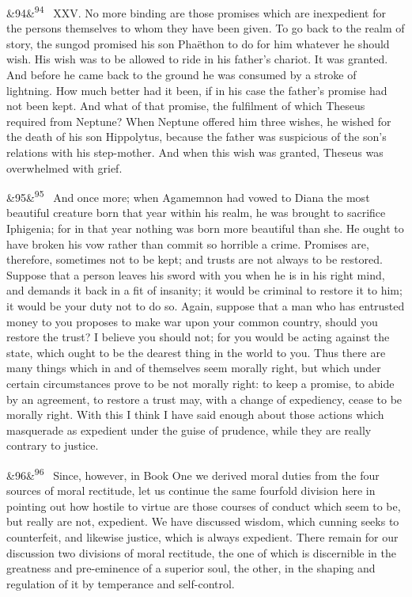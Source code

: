 \documentclass[12pt]{article}
\newcommand{\para}[1][]{\par\noindent\ifx&#1&\else\textsuperscript{\footnotesize #1}~\fi}
\begin{document}
\para[94] XXV. No more binding are those promises which are inexpedient for the persons themselves to whom they have been given. To go back to the realm of story, the sungod promised his son Phaëthon to do for him whatever he should wish. His wish was to be allowed to ride in his father's chariot. It was granted. And before he came back to the ground he was consumed by a stroke of lightning. How much better had it been, if in his case the father's promise had not been kept. And what of that promise, the fulfilment of which Theseus required from Neptune? When Neptune offered him three wishes, he wished for the death of his son Hippolytus, because the father was suspicious of the son's relations with his step-mother. And when this wish was granted, Theseus was overwhelmed with grief.

\para[95] And once more; when Agamemnon had vowed to Diana the most beautiful creature born that year within his realm, he was brought to sacrifice Iphigenia; for in that year nothing was born more beautiful than she. He ought to have broken his vow rather than commit so horrible a crime. Promises are, therefore, sometimes not to be kept; and trusts are not always to be restored. Suppose that a person leaves his sword with you when he is in his right mind, and demands it back in a fit of insanity; it would be criminal to restore it to him; it would be your duty not to do so. Again, suppose that a man who has entrusted money to you proposes to make war upon your common country, should you restore the trust? I believe you should not; for you would be acting against the state, which ought to be the dearest thing in the world to you. Thus there are many things which in and of themselves seem morally right, but which under certain circumstances prove to be not morally right: to keep a promise, to abide by an agreement, to restore a trust may, with a change of expediency, cease to be morally right. With this I think I have said enough about those actions which masquerade as expedient under the guise of prudence, while they are really contrary to justice.

\para[96] Since, however, in Book One we derived moral duties from the four sources of moral rectitude, let us continue the same fourfold division here in pointing out how hostile to virtue are those courses of conduct which seem to be, but really are not, expedient. We have discussed wisdom, which cunning seeks to counterfeit, and likewise justice, which is always expedient. There remain for our discussion two divisions of moral rectitude, the one of which is discernible in the greatness and pre-eminence of a superior soul, the other, in the shaping and regulation of it by temperance and self-control.
\end{document}

